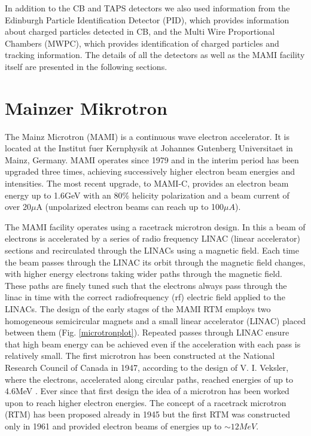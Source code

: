 In addition to the CB and TAPS detectors we also used information from  the Edinburgh Particle Identification Detector (PID), which provides information about charged particles detected in CB, and the Multi Wire Proportional Chambers (MWPC), which provides identification of charged particles and tracking information. The details of all the detectors as well as the MAMI facility itself are presented in the following sections.

\section{Mainzer Mikrotron}

\indent The Mainz Microtron (MAMI) is a continuous wave electron accelerator. It is located at the Institut fuer Kernphysik at Johannes Gutenberg Universitaet in Mainz, Germany. MAMI operates since 1979 and in the interim period has been upgraded three times, achieving successively higher electron beam energies and intensities. The most recent upgrade, to MAMI-C, provides an  electron beam energy up to 1.6GeV with an 80\% helicity polarization and a beam current of over 20$\mu$A (unpolarized electron beams can reach up to 100$\mu A$).

\indent The MAMI facility operates using a racetrack microtron design.  In this a beam of electrons is accelerated by a series of radio frequency LINAC (linear accelerator) sections and recirculated through the LINACs using a magnetic field. Each time the beam passes through the LINAC its orbit through the magnetic field changes, with higher energy electrons taking wider paths through the magnetic field. These paths are finely tuned such that the electrons always pass through the linac in time with the correct radiofrequency (rf) electric field applied to the LINACs.  The design of the early stages of the MAMI RTM employs two homogeneous semicircular magnets and a small linear accelerator (LINAC) placed between them (Fig. \ref{microtronplot}).
Repeated passes through LINAC ensure that high beam energy can be achieved even if the acceleration with each pass is relatively small. The first microtron has been constructed at the National Research Council of Canada in 1947, according to the design of V. I. Veksler, where the electrons, accelerated along circular paths, reached energies of up to 4.6MeV \cite{dehn}. Ever since that first design the idea of a microtron has been worked upon to reach higher electron energies. The concept of a  racetrack microtron (RTM) has been proposed already in 1945 but the first RTM was constructed only in 1961 and provided electron beams of energies up to $\sim12MeV$.

